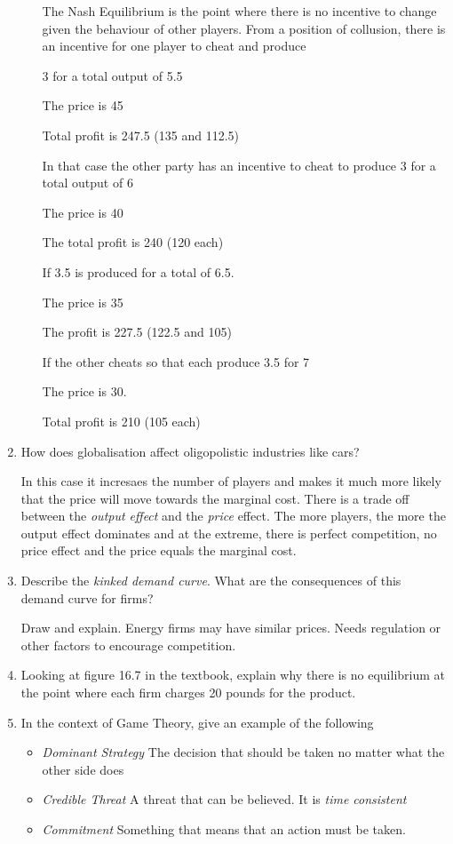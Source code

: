 \documentclass[12pt, a4paper, oneside]{article}\usepackage[]{graphicx}\usepackage[]{color}
\begin{document}
\begin{enumerate}
\begin{itemize}
The Nash Equilibrium is the point where there is no incentive to change given the behaviour of other players.  From a position of collusion, there is an incentive for one player to cheat and produce 

3 for a total output of 5.5 

The price is 45

Total profit is 247.5 (135 and 112.5)

In that case the other party has an incentive to cheat to produce 3 for a total output of 6

The price is 40

The total profit is 240 (120 each)

If 3.5 is produced for a total of 6.5.  

The price is 35

The profit is 227.5 (122.5 and 105)

If the other cheats so that each produce 3.5 for 7

The price is 30. 

Total profit is 210 (105 each)


\end{itemize}

\item How does globalisation affect oligopolistic industries like cars? 

In this case it incresaes the number of players and makes it much more likely that the price will move towards the marginal cost.  There is a trade off between the \emph{output effect} and the \emph{price} effect.  The more players, the more the output effect dominates and at the extreme, there is perfect competition, no price effect and the price equals the marginal cost. 

\item Describe the \emph{kinked demand curve}.  What are the consequences of this demand curve for firms? 

Draw and explain.  Energy firms may have similar prices.  Needs regulation or other factors to encourage competition. 

\item Looking at figure 16.7 in the textbook, explain why there is no equilibrium at the point where each firm charges 20 pounds for the product.  

\item In the context of Game Theory, give an example of the following
\begin{itemize}
\item \emph{Dominant Strategy}
The decision that should be taken no matter what the other side does
\item \emph{Credible Threat}
A threat that can be believed.  It is \emph{time consistent}
\item \emph{Commitment}
Something that means that an action must be taken. 
\end{itemize}


\end{enumerate}
\end{document}
